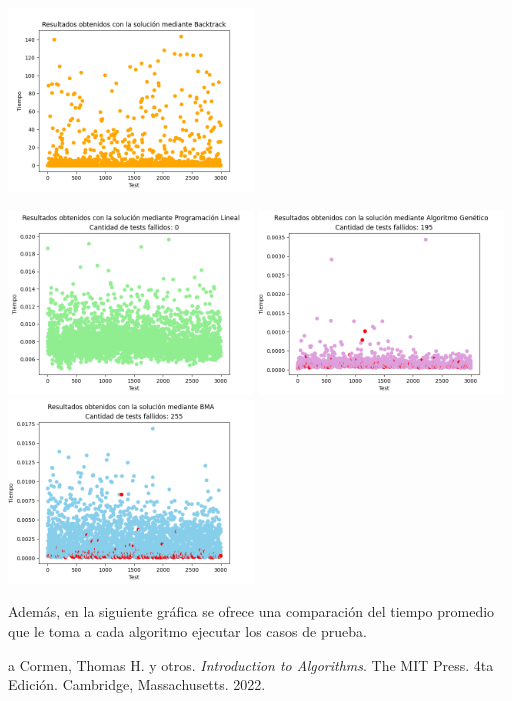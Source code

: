 \documentclass[10pt]{article} %
\begin{document}
    \begin{center}
    	\includegraphics[width=6.5cm]{Backtrack_results.png}
    \end{center}  
	
	\begin{center}
		\includegraphics[width=6.5cm]{LP_results}
		\includegraphics[width=6.5cm]{GA_results}
		\includegraphics[width=6.5cm]{BMA_results}
	\end{center}
 
    Adem\'as, en la siguiente gr\'afica se ofrece una comparaci\'on del tiempo promedio que le toma a cada algoritmo ejecutar los casos de prueba. 
    
	
	\begin{thebibliography}
		a
		 Cormen, Thomas H. y otros. \emph{Introduction to Algorithms}. 
		The MIT Press.
		4ta Edici\'on.		
		Cambridge, Massachusetts.
		2022.
	\end{thebibliography}
\end{document}
